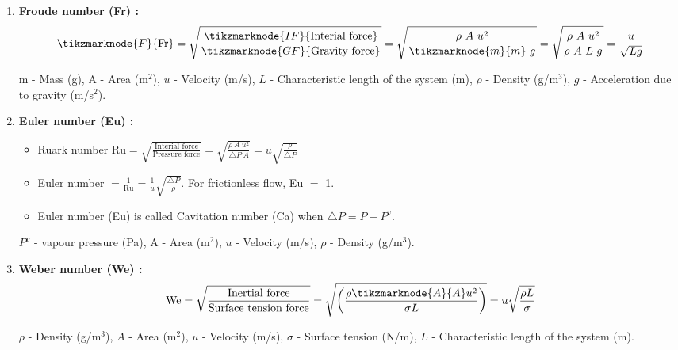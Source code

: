 \documentclass[a4paper, 12 pt]{article}
\begin{document}
\begin{enumerate}
    \item \textbf{Froude number (Fr) :} 
    \[
    \tikzmarknode{F}{\text{Fr}}=\sqrt{\frac{{\tikzmarknode{IF}{\text{Interial force}}}}{{\tikzmarknode{GF}{\text{Gravity force}}}}}=\sqrt{\frac{\rho \ A\ u^2}{\tikzmarknode{m}{m}\ g}}=\sqrt{\frac{\rho \ A\ u^2}{\rho\ A\ L\ g}}=\frac{u}{\sqrt{Lg}}
    \]
    
    
    \vspace{12mm} m - Mass (g), A - Area (m$^2$), $u$ - Velocity (m/s), $L$ - Characteristic length of the system (m), $\rho$ - Density (g/m$^3$), $g$ - Acceleration due to gravity (m/s$^2$).
    
    \item \textbf{Euler number (Eu) :} 
    \begin{itemize}
        \item Ruark number $\text{Ru}=\sqrt{\frac{\text{Interial force}}{\text{Pressure force}}}=\sqrt{\frac{\rho \ A\ u^2}{\triangle P\ A}}=u{\sqrt{\frac{\rho}{\triangle P}}}$
        
        \item Euler number $=\frac{1}{\text{Ru}}=\frac{1}{u}{\sqrt{\frac{\triangle P}{\rho}}}$. For frictionless flow, Eu $=$ 1.
        
        \item Euler number (Eu) is called Cavitation number (Ca) when $\triangle P=P-P^v$.
        
    \end{itemize}
    $P^v$ - vapour pressure (Pa), A - Area (m$^2$), $u$ - Velocity (m/s), $\rho$ - Density (g/m$^3$).
    
    \item \textbf{Weber number (We) :} $$\text{We}=\sqrt{\frac{\text{Inertial force}}{\text{Surface tension force}}}=\sqrt{\bigg(\frac{\rho\tikzmarknode{A}{A}u^2}{\sigma L}\bigg)}=u\sqrt{\frac{\rho L}{\sigma}}$$
    
    $\rho$ - Density (g/m$^3$), $A$ - Area (m$^2$), $u$ - Velocity (m/s), $\sigma$ - Surface tension (N/m), $L$ - Characteristic length of the system (m).
    

\end{enumerate}
\end{document}
